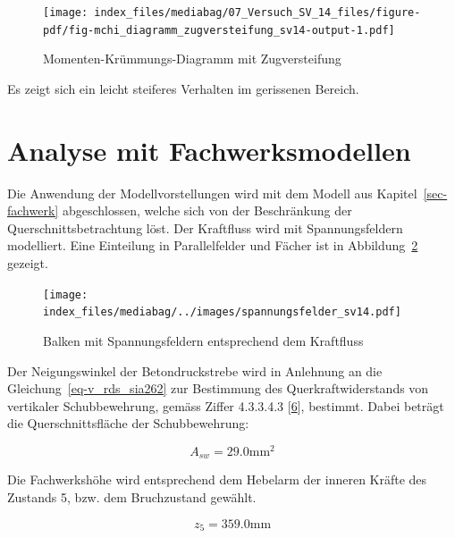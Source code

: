 \documentclass[
  12pt,
  letterpaper,
  egregdoesnotlikesansseriftitles]{scrreprt}
\begin{document}
\begin{figure}[H]

{\centering \texttt{[image: index\_files/mediabag/07\_Versuch\_SV\_14\_files/figure-pdf/fig-mchi\_diagramm\_zugversteifung\_sv14-output-1.pdf]}

}

\caption{\label{fig-mchi_diagramm_zugversteifung_sv14}Momenten-Krümmungs-Diagramm
mit Zugversteifung}

\end{figure}

Es zeigt sich ein leicht steiferes Verhalten im gerissenen Bereich.

\hypertarget{analyse-mit-fachwerksmodellen-1}{%
\section{Analyse mit
Fachwerksmodellen}\label{analyse-mit-fachwerksmodellen-1}}

Die Anwendung der Modellvorstellungen wird mit dem Modell aus
Kapitel~\ref{sec-fachwerk} abgeschlossen, welche sich von der
Beschränkung der Querschnittsbetrachtung löst. Der Kraftfluss wird mit
Spannungsfeldern modelliert. Eine Einteilung in Parallelfelder und
Fächer ist in Abbildung~\ref{fig-spannungsfelder_sv14} gezeigt.

\begin{figure}[H]

{\centering \texttt{[image: index\_files/mediabag/../images/spannungsfelder\_sv14.pdf]}

}

\caption{\label{fig-spannungsfelder_sv14}Balken mit Spannungsfeldern
entsprechend dem Kraftfluss}

\end{figure}

Der Neigungswinkel der Betondruckstrebe wird in Anlehnung an die
Gleichung~\ref{eq-v_rds_sia262} zur Bestimmung des Querkraftwiderstands
von vertikaler Schubbewehrung, gemäss Ziffer 4.3.3.4.3
{[}\protect\hyperlink{ref-SIA2013a}{6}{]}, bestimmt. Dabei beträgt die
Querschnittsfläche der Schubbewehrung:

\begin{equation}A_{s w} = 29.0 \text{mm}^{2}\end{equation}

Die Fachwerkshöhe wird entsprechend dem Hebelarm der inneren Kräfte des
Zustands 5, bzw. dem Bruchzustand gewählt.

\begin{equation}z_{5} = 359.0 \text{mm}\end{equation}
\end{document}
